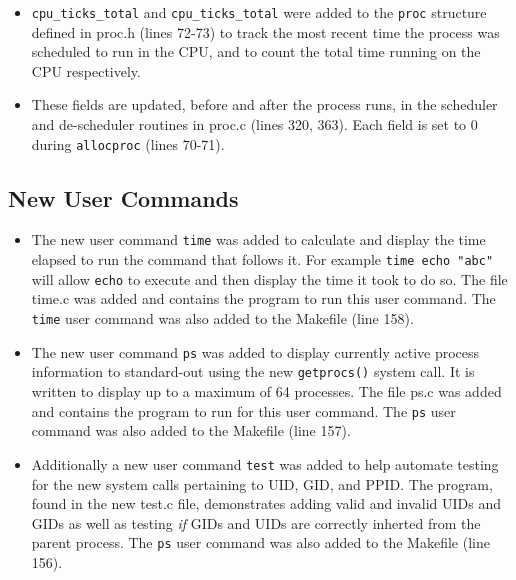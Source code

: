 \documentclass[11pt,letterpaper]{report}
\begin{document}
		\begin{itemize}
			\item {\tt cpu\_ticks\_total} and {\tt cpu\_ticks\_total} were added to the {\tt proc} structure defined in proc.h (lines 72-73)
				to track the most recent time the process was scheduled to run in the CPU, and to count the total time running on the CPU respectively. 
				
			\item These fields are updated, before and after the process runs, in the scheduler and de-scheduler routines in proc.c (lines 320, 363). 
				Each field is set to $0$ during {\tt allocproc} (lines 70-71).

		\end{itemize}
	
	\subsection*{New User Commands}
	
	\begin{itemize}
			\item The new user command {\tt time} was added to calculate and display the time elapsed to run the command that follows it. For example
				{\tt time echo "abc"} will allow {\tt echo} to execute and then display the time it took to do so. The file time.c was added and contains the
				program to run this user command. The {\tt time} user command was also added to the Makefile (line 158).
				
			\item The new user command {\tt ps} was added to display currently active process information to standard-out using the new {\tt getprocs()} system call.
				It is written to display up to a maximum of 64 processes. 
				The file ps.c was added and contains the program to run for this user command. The {\tt ps} user command was also added to the Makefile (line 157).
			
			\item Additionally a new user command {\tt test} was added to help automate testing for the new system calls pertaining to UID, GID, and PPID. The program, 
				found in the new test.c file, demonstrates adding valid and invalid UIDs and GIDs as well as testing \emph{if} GIDs and UIDs are correctly inherted from
				the parent process.  The {\tt ps} user command was also added to the Makefile (line 156).

		\end{itemize}
				
\end{document}
